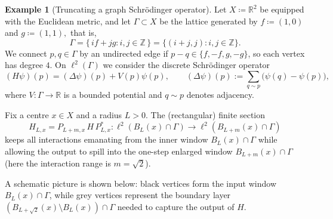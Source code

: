 \documentclass[11pt]{article}
\theoremstyle{definition}
\newtheorem{example}[theorem]{Example}
\newcommand{\Z}{\mathbb{Z}}
\newcommand{\R}{\mathbb{R}}
\begin{document}
\begin{example}[Truncating a graph Schr\"odinger operator]
Let \(X\coloneqq \R^2\) be equipped with the Euclidean metric, and let \(\Gamma\subset X\) be the lattice generated by $f\coloneqq (1,0)$ and $g\coloneqq (1,1),$
that is,
\[
\Gamma=\{\, i f + j g : i,j\in\Z \,\}
      =\{(i+j,j): i,j\in\Z\}.
\]
We connect $p,q\in\Gamma$ by an undirected edge if $p-q \in \{f, -f, g, -g\}$,
so each vertex has degree $4$. On $\ell^2(\Gamma)$ we consider the discrete
Schr\"odinger operator
\[
  (H\psi)(p)=(\Delta\psi)(p)+V(p)\psi(p),
  \qquad
  (\Delta\psi)(p):=\sum_{q\sim p}\bigl(\psi(q)-\psi(p)\bigr),
\]
where $V:\Gamma\to\R$ is a bounded potential and $q\sim p$ denotes adjacency.

Fix a centre $x\in X$ and a radius $L>0$. The (rectangular) finite section
\[
  H_{L,x}=P_{L+m,x}\,H\,P_{L,x}^*
  :\ell^2(B_L(x)\cap\Gamma)\to\ell^2(B_{L+m}(x)\cap\Gamma)
\]
keeps all interactions emanating from the inner window $B_L(x)\cap\Gamma$ while
allowing the output to spill into the one-step enlarged window
$B_{L+m}(x)\cap\Gamma$ (here the interaction range is $m=\sqrt{2}$).

\medskip

\noindent
A schematic picture is shown below: black vertices form the input window
$B_L(x)\cap\Gamma$, while grey vertices represent the boundary layer
$(B_{L+\sqrt{2}}(x)\setminus B_L(x))\cap\Gamma$ needed to capture the output of $H$.

\begin{center}
\end{center}
\end{example}
\end{document}
